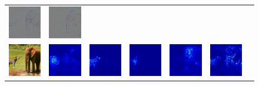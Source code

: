 \begin{figure}
\begin{center}
\begin{tabular}{ccccccc}
\includegraphics[width=0.14\linewidth,height=0.115\linewidth]{figs/examples/vggnet/soft/zeb-ele1_diff_387} &
\includegraphics[width=0.14\linewidth,height=0.115\linewidth]{figs/examples/googlenet/soft/zeb-ele1_diff_387} \\
\vspace{-2.5pt}
\includegraphics[width=0.14\linewidth,height=0.115\linewidth]{figs/examples/googlenet/soft/zeb-ele1} &
\includegraphics[width=0.14\linewidth,height=0.115\linewidth]{figs/examples/alexnet/soft/zeb-ele1_sali_341} &
\includegraphics[width=0.14\linewidth,height=0.115\linewidth]{figs/examples/vggnet/soft/zeb-ele1_sali_341} &
\includegraphics[width=0.14\linewidth,height=0.115\linewidth]{figs/examples/googlenet/soft/zeb-ele1_sali_341} &
\includegraphics[width=0.14\linewidth,height=0.115\linewidth]{figs/examples/alexnet/soft/zeb-ele1_sali_387} &
\includegraphics[width=0.14\linewidth,height=0.115\linewidth]{figs/examples/vggnet/soft/zeb-ele1_sali_387} &

\end{tabular}
\end{center}
\end{figure}
